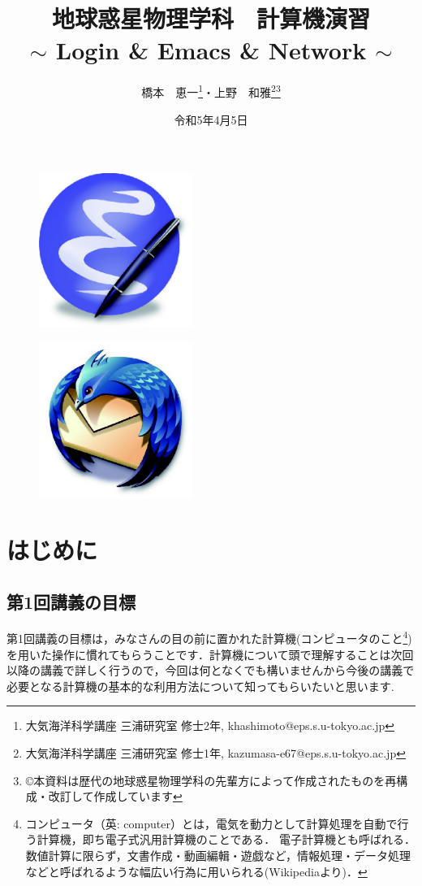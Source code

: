 \documentclass{jarticle}
\title{\bf{地球惑星物理学科　計算機演習}\\
$\sim$ Login \& Emacs \& Network $\sim$}
\author{橋本　恵一\footnote{大気海洋科学講座 三浦研究室 修士2年, khashimoto@eps.s.u-tokyo.ac.jp}・上野　和雅\footnote{大気海洋科学講座 三浦研究室 修士1年, kazumasa-e67@eps.s.u-tokyo.ac.jp}\footnote{\copyright 本資料は歴代の地球惑星物理学科の先輩方によって作成されたものを再構成・改訂して作成しています}}
\date{令和5年4月5日}
\begin{document}
\maketitle

\begin{figure}[h]
 \begin{minipage}{0.5\hsize}
  \begin{center}
   \includegraphics[width=50mm,pagebox=cropbox,clip]{fig/emacs.pdf}
  \end{center}
  \label{fig:one}
 \end{minipage}
 \begin{minipage}{0.5\hsize}
  \begin{center}
   \includegraphics[width=50mm,pagebox=cropbox,clip]{fig/mozilla-thunderbird.pdf}
  \end{center}
  \label{fig:two}
 \end{minipage}
\end{figure}

\tableofcontents

\addtocounter{section}{-1}

\section{はじめに}
\subsection{第1回講義の目標}
第1回講義の目標は，みなさんの目の前に置かれた計算機(コンピュータのこと\footnote{コンピュータ（英: computer）とは，電気を動力として計算処理を自動で行う計算機，即ち電子式汎用計算機のことである． 電子計算機とも呼ばれる． 数値計算に限らず，文書作成・動画編輯・遊戯など，情報処理・データ処理などと呼ばれるような幅広い行為に用いられる(Wikipediaより)．})を用いた操作に慣れてもらうことです．計算機について頭で理解することは次回以降の講義で詳しく行うので，今回は何となくでも構いませんから今後の講義で必要となる計算機の基本的な利用方法について知ってもらいたいと思います.
\end{document}
